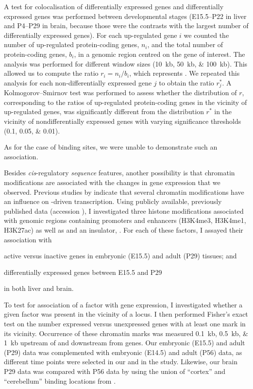 A test for colocalisation of differentially expressed \trna genes and
differentially expressed \mrna genes was performed between developmental stages
(E15.5–P22 in liver and P4–P29 in brain, because those were the contrasts with
the largest number of differentially expressed \trna genes). For each
up-regulated \trna gene \(i\) we counted the number of up-regulated
protein-coding genes, \(n_i\), and the total number of protein-coding genes,
\(b_i\), in a genomic region centred on the \trna gene of interest. The analysis
was performed for different window sizes (\SIlist{10;50;100}{kb}). This allowed
us to compute the ratio \(r_i = {n_i}/{b_i}\), which represents . We
repeated this analysis for each non-differentially expressed \trna gene \(j\) to
obtain the ratio \(r_j^*\). A Kolmogorov–Smirnov test was performed to assess
whether the distribution of \(r\), corresponding to the ratios of up-regulated
protein-coding genes in the vicinity of up-regulated \trna genes, was
significantly different from the distribution \(r^*\) in the vicinity of
nondifferentially expressed \trna genes with varying significance thresholds
(\numlist{0.1;0.05;0.01}).

As for the case of \tf binding sites, we were unable to demonstrate such an
association.

Besides \emph{cis}-regulatory \emph{sequence} features, another possibility is
that chromatin modifications are associated with the changes in \trna gene
expression that we observed. Previous studies by \citet{Barski:2010,Oler:2010}
indicate that several chromatin modifications have an influence on -driven
transcription. Using publicly available, previously published data
\citep{Shen:2012} (\geo accession ), I investigated three
histone modifications associated with genomic regions containing promoters and
enhancers (H3K4me3, H3K4me1, H3K27ac) as well as  and an insulator, \ctcf.
For each of these factors, I assayed their association with

\begin{shortenumerate}
    \item active versus inactive \trna genes in embryonic (E15.5) and adult
        (P29) tissues; and
    \item differentially expressed \trna genes between E15.5 and P29
\end{shortenumerate}

in both liver and brain.

To test for association of a factor with \trna gene expression, I investigated
whether a given factor was present in the vicinity of a \trna locus. I then
performed Fisher’s exact test on the number expressed versus unexpressed \trna
genes with at least one mark in its vicinity. Occurrence of these chromatin
marks was measured \SIlist{0.1;0.5;1}{kb} upstream of and downstream from \trna
genes. Our embryonic (E15.5) and adult (P29)  data was complemented with
embryonic (E14.5) and adult (P56) \chipseq data, as different time points were
selected in our and in the \citet{Shen:2012} study. Likewise, our brain P29 data
was compared with P56 data by using the union of “cortex” and “cerebellum”
\chipseq binding locations from \citet{Shen:2012}.

